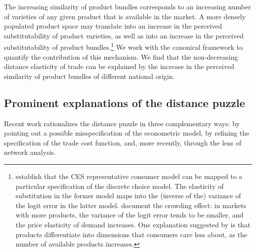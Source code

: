 \documentclass[12pt,twoside,a4paper,notitlepage]{article}
\begin{document}
The increasing similarity of product bundles corresponds to an increasing number of varieties of any given product that is available in the market. 
A more densely populated product space may translate into an increase in the perceived substitutability of product varieties, as well as into an increase in the perceived substitutability of product bundles.\footnote{\cite{Anderson1992} establish that the CES representative consumer model can be mapped to a particular specification of the discrete choice model. The elasticity of substitution in the former model maps into the (inverse of the) variance of the logit error in the latter model. \cite{Ackerberg2005} document the crowding effect: in markets with more products, the variance of the logit error tends to be smaller, and the price elasticity of demand increases. One explanation suggested by \cite{Ackerberg2005} is that products differentiate into dimensions that consumers care less about, as the number of available products increases.}
We work with the canonical \cite{Anderson2003} framework to quantify the contribution of this mechanism.
We find that the non-decreasing distance elasticity of trade can be explained by the increase in the perceived similarity of product bundles of different national origin. 


\subsection*{Prominent explanations of the distance puzzle}
Recent work rationalizes the distance puzzle in three complementary ways: by pointing out a possible misspecification of the econometric model, by refining the specification of the trade cost function, and, more recently, through the lens of network analysis.
\end{document}
